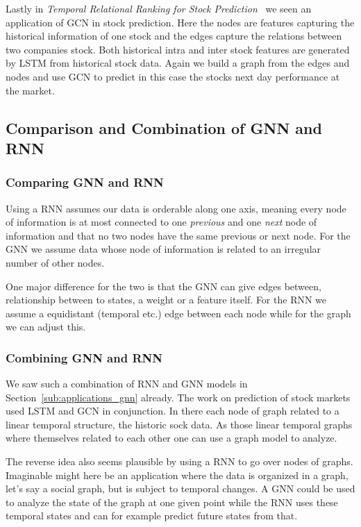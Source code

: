 \documentclass{article}
\begin{document}
Lastly in \textit{Temporal Relational Ranking for Stock Prediction}~\cite{feng2019} we seen an application of GCN in stock prediction.
Here the nodes are features capturing the historical information of one stock and the edges capture the relations between two companies stock.
Both historical intra and inter stock features are generated by LSTM from historical stock data.
Again we build a graph from the edges and nodes and use GCN to predict in this case the stocks next day performance at the market.

\subsection{Comparison and Combination of GNN and RNN}
\subsubsection{Comparing GNN and RNN}
Using a RNN assumes our data is orderable along one axis, meaning every node of information is at most connected to one \textit{previous} and one \textit{next} node of information and that no two nodes have the same previous or next node.
For the GNN we assume data whose node of information is related to an irregular number of other nodes.

One major difference for the two is that the GNN can give edges between, relationship between to states, a weight or a feature itself.
For the RNN we assume a equidistant (temporal etc.) edge between each node while for the graph we can adjust this.


\subsubsection{Combining GNN and RNN}
We saw such a combination of RNN and GNN models in Section~\ref{sub:applications_gnn} already. The work on prediction of stock markets used LSTM and GCN in conjunction.
In there each node of graph related to a linear temporal structure, the historic sock data.
As those linear temporal graphs where themselves related to each other one can use a graph model to analyze.

The reverse idea also seems plausible by using a RNN to go over nodes of graphs.
Imaginable might here be an application where the data is organized in a graph, let's say a social graph, but is subject to temporal changes.
A GNN could be used to analyze the state of the graph at one given point while the RNN uses these temporal states and can for example predict future states from that.



\end{document}
